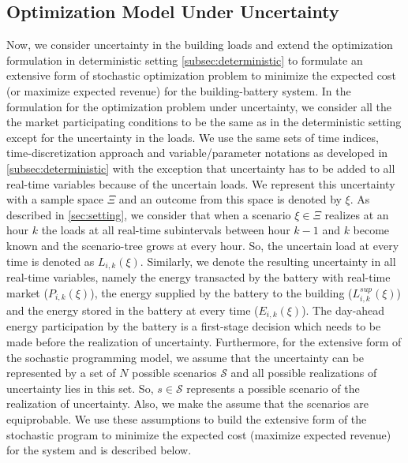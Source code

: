 \documentclass[11pt,twoside]{article}
\begin{document}
\subsection{Optimization Model Under Uncertainty} \label{subsec:opt_unc}
Now, we consider uncertainty in the building loads and extend the optimization formulation in deterministic setting \ref{subsec:deterministic} to formulate an extensive form of stochastic optimization problem to minimize the expected cost (or maximize expected revenue) for the building-battery system. In the formulation for the optimization problem under uncertainty, we consider all the the market participating conditions to be the same as in the deterministic setting except for the uncertainty in the loads. We use the same sets of time indices, time-discretization approach and variable/parameter notations as developed in \ref{subsec:deterministic} with the exception that uncertainty has to be added to all real-time variables because of the uncertain loads. We represent this uncertainty with a sample space $\Xi$ and an outcome from this space is denoted by $\xi$. As described in \ref{sec:setting}, we consider that when a scenario $\xi \in \Xi$ realizes at an hour $k$ the loads at all real-time subintervals between hour $k-1$ and $k$ become known and the scenario-tree grows at every hour. So, the uncertain load at every time is denoted as $L_{i,k}(\xi)$. Similarly, we denote the resulting uncertainty in all real-time variables, namely the energy transacted by the battery with real-time market ($P_{i,k}(\xi)$), the energy supplied by the battery to the building ($L^{sup}_{i,k}(\xi)$) and the energy stored in the battery at every time ($E_{i,k}(\xi)$). The day-ahead energy participation by the battery is a first-stage decision which needs to be made before the realization of uncertainty. Furthermore, for the extensive form of the sochastic programming model, we assume that the uncertainty can be represented by a set of $N$ possible scenarios $\mathcal{S}$ and all possible realizations of uncertainty lies in this set. So, $s \in \mathcal{S}$ represents a possible scenario of the realization of uncertainty. Also, we make the assume that the scenarios are equiprobable. We use these assumptions to build the extensive form of the stochastic program to minimize the expected cost (maximize expected revenue) for the system and is described below.
\end{document}
